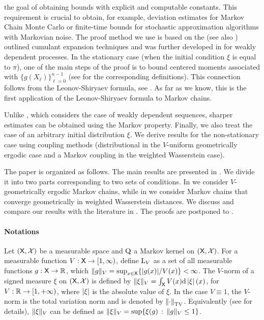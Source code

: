 the goal of obtaining bounds with explicit and computable constants. This requirement is crucial to obtain, for example, deviation estimates for Markov Chain Monte Carlo or finite-time bounds for stochastic approximation algorithms with Markovian noise. The proof method we use is based on the \cite{bentkus:1980} (see also \cite{saulis:statulevicius:1991}) outlined cumulant expansion techniques and was further developed in \cite{doukhan2007probability} for weakly dependent processes. In the stationary case (when the initial condition $\xi$ is equal to $\pi$), one of the main steps of the proof is to bound centered moments associated with $\{g(X_{\ell})\}_{\ell=0}^{n-1}$ (see  for the corresponding definitions). This connection follows from the Leonov-Shiryaev formula, see \cite{leonov:sirjaev:1959}. As far as we know, this is the first application of the Leonov-Shiryaev formula to Markov chains. 
\par 
Unlike \cite{doukhan2007probability}, which considers the case of weakly dependent sequences, sharper estimates can be obtained using the Markov property. Finally, we also treat the case of an arbitrary initial distribution $\xi$. We derive results for the non-stationary case using coupling methods (distributional in the $V$-uniform geometrically ergodic case and a Markov coupling in the weighted Wasserstein case).
\par 
The paper is organized as follows. The main results are presented in . We divide it into two parts corresponding to two sets of conditions. In  we consider $V$-geometrically ergodic Markov chains, while in  we consider Markov chains that converge geometrically in weighted Wasserstein distances. We discuss and compare our results with the literature in . The proofs are postponed to .



\paragraph{Notations}
Let $(\Xset,\Xsigma)$ be a measurable space and $\MK$ a Markov kernel on $(\Xset,\Xsigma)$. For a measurable function $V: \Xset \to \coint{1,\infty}$, define $\mrl_V$ as a set of all measurable functions $g: \Xset \to \rset$, which $\Vnorm[V]{g}= \sup_{x \in \Xset} \{| g(x) | / V(x) \} < \infty$. The
$V$-norm of a signed measure $\xi$ on $(\Xset,\Xsigma)$ is defined by
$\Vnorm[V]{\xi} = \int_{\Xset} V(x) \rmd \abs{\xi}(x)$, for
$V : \rset \to \coint{1,\plusinfty}$, where $\abs{\xi}$ is the absolute value of $\xi$. In the case $V \equiv 1$, the $V$-norm is the total variation norm and is denoted by $\tvnorm{\cdot}$. Equivalently (see \cite[Theorem D.3.2]{douc:moulines:priouret:soulier:2018} for details), $\Vnorm[V]{\xi}$ can be defined as $\Vnorm[V]{\xi} = \sup\{ \xi(g) \, :\, \Vnorm[V]{g}\leq 1\}$.

